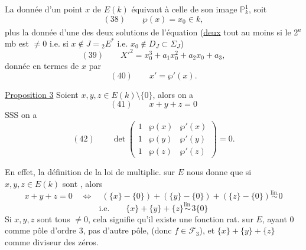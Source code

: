 La donnée d'un point $x$  de $E(k)$ équivaut à celle de son image
 $\mathbb P^1_k$, soit 
\[
(38)\qquad \wp(x)=x_0\in k,
\]
plus la donnée d'une des deux solutions  de l'équation
(\uline{deux} tout au moins si le 2\textsuperscript{e} mb est $\ne0$ i.e.
si $x\notin J={}_2E^*$ i.e. $x_0\notin D_J\subset\Sigma_J$)
\[
(39)\qquad X'^2=x_0^3+a_1x_0^2+a_2x_0+a_3,
\]
donnée en termes de $x$ par
\[
(40)\qquad x'=\wp'(x).
\]

\uline{Proposition 3} Soient $x,y,z\in E(k)\setminus\{0\}$,
 alors on a
\[
(41)\qquad x+y+z=0
\]
SSS on a 
\[
(42)\qquad \det\begin{pmatrix}
1&\wp(x)&\wp'(x)\\
1&\wp(y)&\wp'(y)\\
1&\wp(z)&\wp'(z)
\end{pmatrix}=0.
\]

En effet, la définition de la loi de multiplic. sur $E$ nous donne que si
$x,y,z\in E(k)$ sont , alors 
\[
x+y+z=0\quad\Longleftrightarrow\quad
(\{x\}-\{0\})+(\{y\}-\{0\})+(\{z\}-\{0\})\overset{\mathrm{lin.}}\sim0
\]
\[
\text{i.e.}\qquad \{x\}+\{y\}+\{z\}\overset{\mathrm{lin.}}\sim3\{0\}
\]
Si $x,y,z$ sont tous $\ne0$, cela signifie qu'il existe une fonction rat. sur $E$,
ayant $0$ comme pôle d'ordre 3, pas d'autre pôle, (donc $f\in\mathcal F_3$),
et $\{x\}+\{y\}+\{z\}$ comme  diviseur des zéros.


